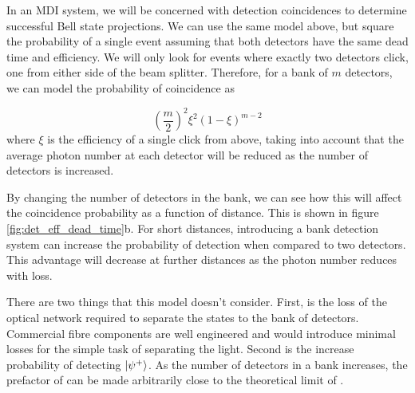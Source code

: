 In an \ac{MDI} system, we will be concerned with detection coincidences to determine successful Bell state projections. We can use the same model above, but square the probability of a single event assuming that both detectors have the same dead time and efficiency. We will only look for events where exactly two detectors click, one from either side of the beam splitter. Therefore, for a bank of $m$ detectors, we can model the probability of coincidence as

\begin{equation}
	\left(\frac{m}{2}\right)^2 \xi^2 (1-\xi)^{m-2}
\end{equation}
where $\xi$ is the efficiency of a single click from above, taking into account that the average photon number at each detector will be reduced as the number of detectors is increased. 

By changing the number of detectors in the bank, we can see how this will affect the coincidence probability as a function of distance. This is shown in figure \ref{fig:det_eff_dead_time}b. For short distances, introducing a bank detection system can increase the probability of detection when compared to two detectors. This advantage will decrease at further distances as the photon number reduces with loss.

There are two things that this model doesn't consider. First, is the loss of the optical network required to separate the states to the bank of detectors. Commercial fibre components are well engineered and would introduce minimal losses for the simple task of separating the light. Second is the increase probability of detecting $\ket{\psi^+}$. As the number of detectors in a bank increases, the prefactor of  can be made arbitrarily close to the theoretical limit of .


%

